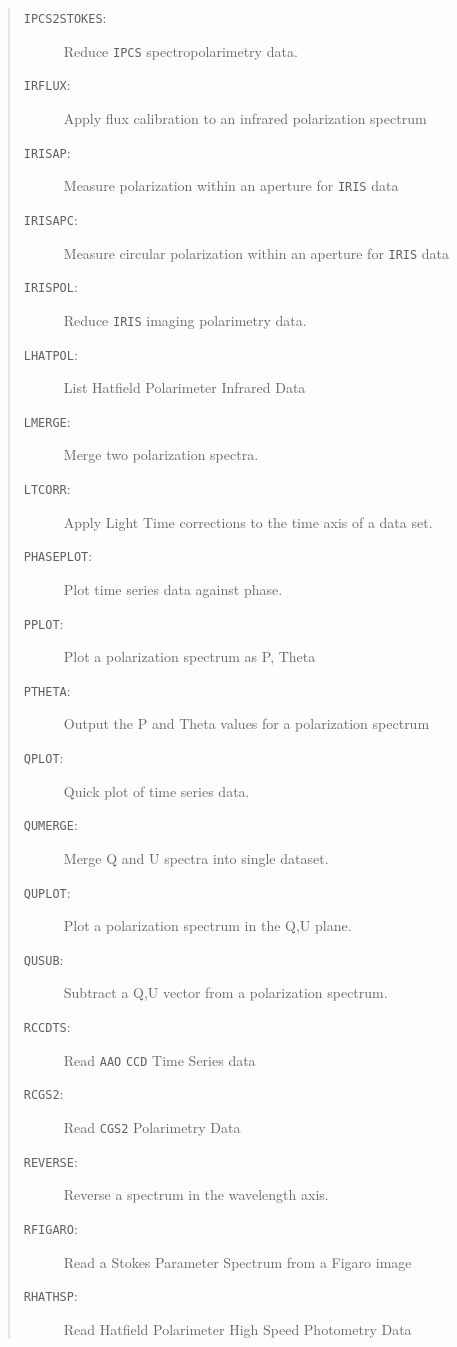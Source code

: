 \documentclass[11pt,twoside]{article}
\renewcommand{\_}{\texttt{\symbol{95}}}
\newenvironment{mansectionroutines}{\begin{quote}\begin{description}}%
{\end{description}\end{quote}}
\newcommand{\mansectionitem}[1]{\item[#1:]\mbox{}}
\newcommand{\mantt}{\tt}
\begin{document}
\begin{mansectionroutines}
\mansectionitem{{\mantt{IPCS2STOKES}}}
        Reduce {\mantt{IPCS}} spectropolarimetry data.

\mansectionitem{{\mantt{IRFLUX}}}
        Apply flux calibration to an infrared polarization spectrum

\mansectionitem{{\mantt{IRISAP}}}
        Measure polarization within an aperture for {\mantt{IRIS}} data

\mansectionitem{{\mantt{IRISAPC}}}
        Measure circular polarization within an aperture for {\mantt{IRIS}} data

\mansectionitem{{\mantt{IRISPOL}}}
        Reduce {\mantt{IRIS}} imaging polarimetry data.

\mansectionitem{{\mantt{LHATPOL}}}
        List Hatfield Polarimeter Infrared Data

\mansectionitem{{\mantt{LMERGE}}}
        Merge two polarization spectra.

\mansectionitem{{\mantt{LTCORR}}}
        Apply Light Time corrections to the time axis of a data set.

\mansectionitem{{\mantt{PHASEPLOT}}}
        Plot time series data against phase.

\mansectionitem{{\mantt{PPLOT}}}
        Plot a polarization spectrum as P, Theta

\mansectionitem{{\mantt{PTHETA}}}
        Output the P and Theta values for a polarization spectrum

\mansectionitem{{\mantt{QPLOT}}}
        Quick plot of time series data.

\mansectionitem{{\mantt{QUMERGE}}}
        Merge Q and U spectra into single dataset.

\mansectionitem{{\mantt{QUPLOT}}}
        Plot a polarization spectrum in the Q,U plane.

\mansectionitem{{\mantt{QUSUB}}}
        Subtract a Q,U vector from a polarization spectrum.

\mansectionitem{{\mantt{RCCDTS}}}
        Read {\mantt{AAO}} {\mantt{CCD}} Time Series data

\mansectionitem{{\mantt{RCGS2}}}
        Read {\mantt{CGS2}} Polarimetry Data

\mansectionitem{{\mantt{REVERSE}}}
        Reverse a spectrum in the wavelength axis.

\mansectionitem{{\mantt{RFIGARO}}}
        Read a Stokes Parameter Spectrum from a Figaro image

\mansectionitem{{\mantt{RHATHSP}}}
        Read Hatfield Polarimeter High Speed Photometry Data


\end{mansectionroutines}
\end{document}
